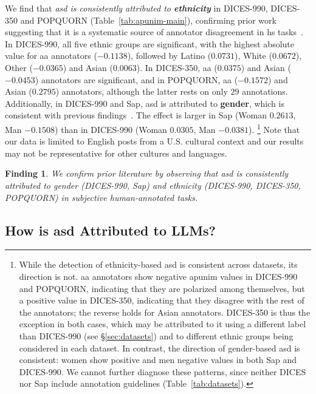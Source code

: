 \documentclass[manuscript,screen,review,anonymous]{acmart}
\theoremstyle{acmplain}
\newtheorem{finding}{Finding}
\theoremstyle{researchquestionstyle}
\begin{document}
We find that \emph{\ac{asd} is consistently attributed to \textbf{ethnicity}} in DICES-990, DICES-350 and POPQUORN (Table~\ref{tab:apunim-main}), confirming prior work suggesting that it is a systematic source of annotator disagreement in \ac{hs} tasks~\citep{goyal2022your}. In DICES-990, all five ethnic groups are significant, with the highest absolute value for \ac{aa} annotators ($-0.1138$), followed by Latino ($0.0731$), White ($0.0672$), Other ($-0.0365$) and Asian ($0.0063$). In DICES-350, \ac{aa} ($0.0375$) and Asian ($-0.0453$) annotators are significant, and in POPQUORN, \ac{aa} ($-0.1572$) and Asian ($0.2795$) annotators, although the latter rests on only $29$ annotations. Additionally, in DICES-990 and Sap, \ac{asd} is attributed to \textbf{gender}, which is consistent with previous findings~\citep{wojatzki2018women, binns2017like}. The effect is larger in Sap (Woman $0.2613$, Man $-0.1508$) than in DICES-990 (Woman $0.0305$, Man $-0.0381$).%
\footnote{While the detection of ethnicity-based \ac{asd} is consistent across datasets, its direction is not. \ac{aa} annotators show negative apunim values in DICES-990 and POPQUORN, indicating that they are polarized among themselves, but a positive value in DICES-350, indicating that they disagree with the rest of the annotators; the reverse holds for Asian annotators. DICES-350 is thus the exception in both cases, which may be attributed to it using a different label than DICES-990 (see \S\ref{sec:datasets}) and to different ethnic groups being considered in each dataset. In contrast, the direction of gender-based \ac{asd} is consistent: women show positive and men negative values in both Sap and DICES-990. We cannot further diagnose these patterns, since neither DICES nor Sap include annotation guidelines (Table~\ref{tab:datasets}).} Note that our data is limited to English posts from a U.S. cultural context and our results may not be representative for other cultures and languages.

\begin{finding}
	\label{finding:human}
	We confirm prior literature by observing that \ac{asd} is consistently attributed to gender (DICES-990, Sap) and ethnicity (DICES-990, DICES-350, POPQUORN) in subjective human-annotated tasks.
\end{finding}


\subsection{How is \ac{asd} Attributed to LLMs?}
\end{document}
